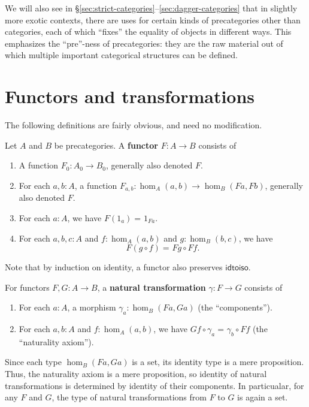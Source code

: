 \documentclass{amsart}
\newcommand{\id}[3][]{\ensuremath{#2 =_{#1} #3}\xspace}
\theoremstyle{definition}
\theoremstyle{remark}
\numberwithin{equation}{section}
\newcommand{\idtoiso}{\ensuremath{\mathsf{idtoiso}}\xspace}
\begin{document}
We will also see in \S\ref{sec:strict-categories}--\ref{sec:dagger-categories} that in slightly more exotic contexts, there are uses for certain kinds of precategories other than categories, each of which ``fixes'' the equality of objects in different ways.
This emphasizes the ``pre''-ness of precategories: they are the raw material out of which multiple important categorical structures can be defined.


\section{Functors and transformations}
\label{sec:transfors}

The following definitions are fairly obvious, and need no modification.

\begin{defn}\label{ct:functor}
  Let $A$ and $B$ be precategories.
  A \textbf{functor} $F:A\to B$ consists of
  \begin{enumerate}
  \item A function $F_0:A_0\to B_0$, generally also denoted $F$.
  \item For each $a,b:A$, a function $F_{a,b}:\hom_A(a,b) \to \hom_B(Fa,Fb)$, generally also denoted $F$.
  \item For each $a:A$, we have $\id{F(1_a)}{1_{Fa}}$.
  \item For each $a,b,c:A$ and $f:\hom_A(a,b)$ and $g:\hom_B(b,c)$, we have
    \[\id{F(g\circ f)}{Fg\circ Ff}.\]
  \end{enumerate}
\end{defn}

Note that by induction on identity, a functor also preserves \idtoiso.

\begin{defn}\label{ct:nattrans}
  For functors $F,G:A\to B$, a \textbf{natural transformation} $\gamma:F\to G$ consists of
  \begin{enumerate}
  \item For each $a:A$, a morphism $\gamma_a:\hom_B(Fa,Ga)$ (the ``components'').
  \item For each $a,b:A$ and $f:\hom_A(a,b)$, we have $\id{Gf\circ \gamma_a}{\gamma_b\circ Ff}$ (the ``naturality axiom'').
  \end{enumerate}
\end{defn}

Since each type $\hom_B(Fa,Ga)$ is a set, its identity type is a mere proposition.
Thus, the naturality axiom is a mere proposition, so identity of natural transformations is determined by identity of their components.
In particualar, for any $F$ and $G$, the type of natural transformations from $F$ to $G$ is again a set.
\end{document}

